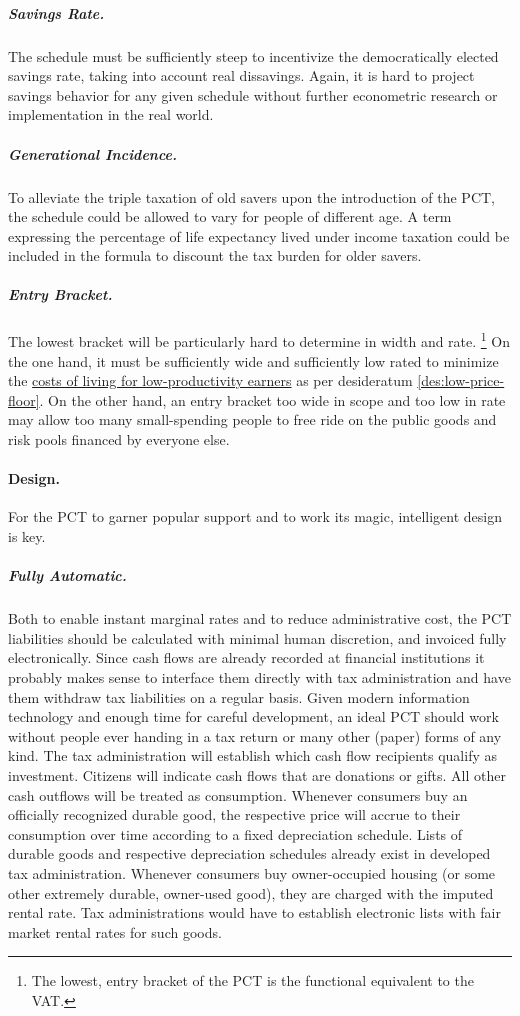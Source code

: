 \subparagraph{Savings Rate.}
The schedule must be sufficiently steep to incentivize the democratically elected savings rate, taking into account real dissavings.
Again, it is hard to project savings behavior for any given schedule without further econometric research or implementation in the real world.

\subparagraph{Generational Incidence.}
To alleviate the triple taxation of old savers upon the introduction of the PCT, the schedule could be allowed to vary for people of different age.
A term expressing the percentage of life expectancy lived under income taxation could be included in the formula to discount the tax burden for older savers.

\subparagraph{Entry Bracket.}
The lowest bracket will be particularly hard to determine in width and rate.
\footnote{
	The lowest, entry bracket of the PCT is the functional equivalent to the VAT.
}
On the one hand, it must be sufficiently wide and sufficiently low rated to minimize the \hyperref[des:low-price-floor]{costs of living for low-productivity earners} as per desideratum \ref{des:low-price-floor}.
On the other hand, an entry bracket too wide in scope and too low in rate may allow too many small-spending people to free ride on the public goods and risk pools financed by everyone else.

\paragraph{Design.}
For the PCT to garner popular support and to work its magic, intelligent design is key.

\subparagraph{Fully Automatic.}
Both to enable instant marginal rates and to reduce administrative cost, the PCT liabilities should be calculated with minimal human discretion, and invoiced fully electronically.
Since cash flows are already recorded at financial institutions it probably makes sense to interface them directly with tax administration and have them withdraw tax liabilities on a regular basis.
Given modern information technology and enough time for careful development, an ideal PCT should work without people ever handing in a tax return or many other (paper) forms of any kind.
The tax administration will establish which cash flow recipients qualify as investment.
Citizens will indicate cash flows that are donations or gifts.
All other cash outflows will be treated as consumption.
Whenever consumers buy an officially recognized durable good, the respective price will accrue to their consumption over time according to a fixed depreciation schedule.
Lists of durable goods and respective depreciation schedules already exist in developed tax administration.
Whenever consumers buy owner-occupied housing (or some other extremely durable, owner-used good), they are charged with the imputed rental rate.
Tax administrations would have to establish electronic lists with fair market rental rates for such goods.

